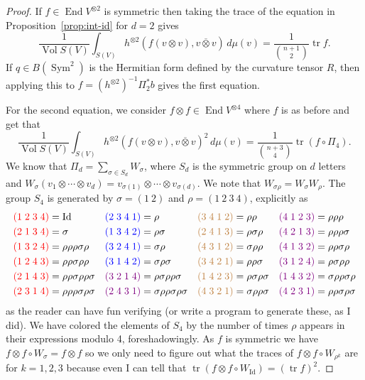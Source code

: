 \documentclass[10pt,a4paper]{amsart}
\theoremstyle{definition}
\def\ov#1{\overline{#1}}
\DeclareMathOperator{\Sym}{Sym}
\DeclareMathOperator{\id}{Id}
\DeclareMathOperator{\tr}{tr}
\DeclareMathOperator{\Vol}{Vol}
\DeclareMathOperator{\End}{End}
\begin{document}
\begin{proof}
If $f \in \End V^{\otimes 2}$ is symmetric then taking the trace of the
equation in Proposition~\ref{prop:int-id} for $d = 2$ gives
$$
\frac{1}{\Vol S(V)}
\int_{S(V)} h^{\otimes 2}(f(v \otimes v), \ov{v \otimes v}) \, d\mu(v)
= \frac{1}{\binom{n+1}{2}} \tr f.
$$
If $q \in B(\Sym^2)$ is the Hermitian form defined by the curvature tensor $R$,
then applying this to $f = (h^{\otimes 2})^{-1} \Pi_2^* b$ gives the first
equation.

For the second equation, we consider $f \otimes f \in \End V^{\otimes 4}$ where
$f$ is as before and get that
$$
\frac{1}{\Vol S(V)}
\int_{S(V)} h^{\otimes 2}(f(v \otimes v), \ov{v \otimes v})^2 \, d\mu(v)
= \frac{1}{\binom{n+3}{4}}
\tr (f \circ \Pi_4).
$$
We know that $\Pi_d = \sum_{\sigma \in S_d} W_\sigma$, where $S_d$ is the
symmetric group on $d$ letters and $W_\sigma(v_1 \otimes \cdots \otimes v_d) =
v_{\sigma(1)} \otimes \cdots \otimes v_{\sigma(d)}$.
We note that $W_{\sigma\rho} = W_\sigma W_\rho$.
The group $S_4$ is generated by
$\sigma = (1 \  2)$ and
$\rho = (1 \  2 \  3 \  4)$, explicitly as%
\def\ze#1{{\color{red}#1}}
\def\on#1{{\color{blue}#1}}
\def\tw#1{{\color{brown}#1}}
\def\th#1{{\color{violet}#1}}
\begin{align*}
\ze{(1\;2\;3\;4)} &= \id
	     &
\on{(2\;3\;4\;1)} &= \rho
	     &
\tw{(3\;4\;1\;2)} &= \rho \rho
	     &
\th{(4\;1\;2\;3)} &= \rho \rho \rho
\\
\ze{(2\;1\;3\;4)} &= \sigma
	     &
\on{(1\;3\;4\;2)} &= \rho\sigma
	     &
\tw{(2\;4\;1\;3)} &= \rho \sigma \rho
	     &
\th{(4\;2\;1\;3)} &= \rho \rho \rho\sigma
\\
\ze{(1\;3\;2\;4)} &= \rho \rho \rho \sigma \rho
	     &
\on{(3\;2\;4\;1)} &= \sigma\rho
	     &
\tw{(4\;3\;1\;2)} &= \sigma\rho \rho
	     &
\th{(4\;1\;3\;2)} &= \rho \rho \sigma \rho
\\
\ze{(1\;2\;4\;3)} &= \rho \rho \sigma \rho \rho
	     &
\on{(3\;1\;4\;2)} &= \sigma \rho \sigma
	     &
\tw{(3\;4\;2\;1)} &= \rho \rho\sigma
	     &
\th{(3\;1\;2\;4)} &= \rho \sigma \rho \rho
\\
\ze{(2\;1\;4\;3)} &= \rho \rho \sigma \rho \rho \sigma
		  &
\th{(3\;2\;1\;4)} &= \rho \sigma \rho \rho \sigma
	     &
\tw{(1\;4\;2\;3)} &=  \rho\sigma \rho \sigma
	     &
\th{(1\;4\;3\;2)} &= \sigma \rho \rho \sigma \rho
\\
\ze{(2\;3\;1\;4)} &= \rho \rho \rho \sigma \rho \sigma
	     &
\th{(2\;4\;3\;1)} &= \sigma \rho \rho \sigma \rho \sigma
	     &
\tw{(4\;3\;2\;1)} &= \sigma \rho \rho \sigma
	     &
\th{(4\;2\;3\;1)} &= \rho \rho \sigma \rho\sigma
\end{align*}
as the reader can have fun verifying (or write a program to generate these, as
I did).
We have colored the elements of $S_4$ by the number of times $\rho$ appears
in their expressions modulo 4, foreshadowingly.
As $f$ is symmetric we have $f \otimes f \circ W_{\sigma} = f \otimes f$
so we only need to figure out what the traces of $f \otimes f \circ W_{\rho^k}$
are for $k = 1, 2, 3$ because even I can tell that
$\tr(f \otimes f \circ W_{\id}) = (\tr f)^2$.


\end{proof}
\end{document}
